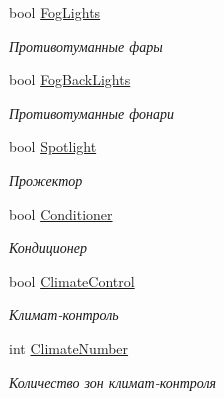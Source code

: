\begin{DoxyCompactItemize}
bool \hyperlink{class_r_t_1_1_parsing_libs_1_1_models_1_1_automoto_additional_info_a2fbccf816ca27f54cd3ed4917a380f25}{Fog\+Lights}
\begin{DoxyCompactList}\small\item\em Противотуманные фары \end{DoxyCompactList}\item 
bool \hyperlink{class_r_t_1_1_parsing_libs_1_1_models_1_1_automoto_additional_info_afa27c4d8a9eb4cdde849fe3657ab5cbd}{Fog\+Back\+Lights}
\begin{DoxyCompactList}\small\item\em Противотуманные фонари \end{DoxyCompactList}\item 
bool \hyperlink{class_r_t_1_1_parsing_libs_1_1_models_1_1_automoto_additional_info_a2bc89f401774e24820339a3cb44c0c2a}{Spotlight}
\begin{DoxyCompactList}\small\item\em Прожектор \end{DoxyCompactList}\item 
bool \hyperlink{class_r_t_1_1_parsing_libs_1_1_models_1_1_automoto_additional_info_a9376dbe97f60b2ccdcdabdfcbf4b44ba}{Conditioner}
\begin{DoxyCompactList}\small\item\em Кондиционер \end{DoxyCompactList}\item 
bool \hyperlink{class_r_t_1_1_parsing_libs_1_1_models_1_1_automoto_additional_info_aa4fbf6ff9ddb3ae5707c8d1949d331ca}{Climate\+Control}
\begin{DoxyCompactList}\small\item\em Климат-\/контроль \end{DoxyCompactList}\item 
int \hyperlink{class_r_t_1_1_parsing_libs_1_1_models_1_1_automoto_additional_info_af86fc548bd906cb5f8d11b60d7bb6524}{Climate\+Number}
\begin{DoxyCompactList}\small\item\em Количество зон климат-\/контроля \end{DoxyCompactList}\item 

\end{DoxyCompactItemize}
